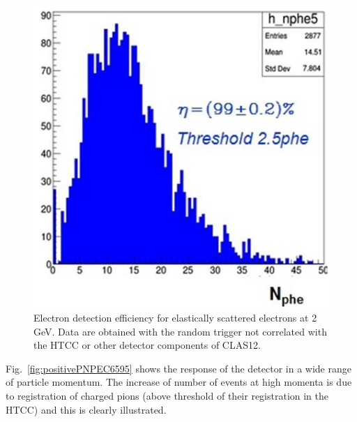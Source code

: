 \begin{figure}[!ht]
    \centering
    \includegraphics[width=1.0\linewidth,trim={0.0cm 0.0cm 0.0cm 0.0cm},clip]{images/RAFO_2GeV.jpg}
    \caption{Electron detection efficiency for elastically scattered electrons at 2 GeV. Data are obtained with the random trigger not correlated with the HTCC or other detector components of CLAS12.}
    \label{fig:RAFO_2GeV}
\end{figure}

Fig.~\ref{fig:positivePNPEC6595} shows the response of the detector in a wide range of particle momentum. The increase of number of events at high momenta is due to registration of charged pions (above threshold of their registration in the HTCC) and this is clearly illustrated.

